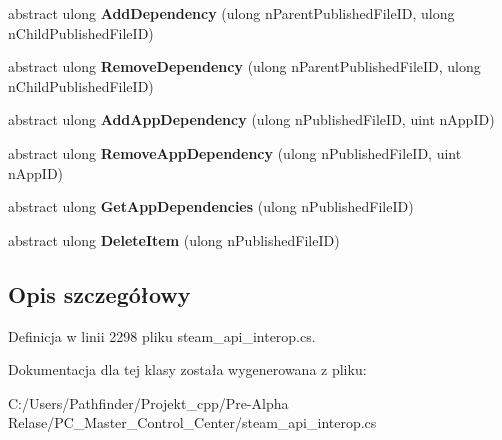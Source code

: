 \begin{DoxyCompactItemize}
abstract ulong {\bfseries Add\+Dependency} (ulong n\+Parent\+Published\+File\+ID, ulong n\+Child\+Published\+File\+ID)
\item 
\mbox{\label{class_valve_1_1_steamworks_1_1_i_steam_u_g_c_aa069183b31a33014ed957a5f93f83eba}} 
abstract ulong {\bfseries Remove\+Dependency} (ulong n\+Parent\+Published\+File\+ID, ulong n\+Child\+Published\+File\+ID)
\item 
\mbox{\label{class_valve_1_1_steamworks_1_1_i_steam_u_g_c_a9b70961d040f10958eb9deeb4f6868d5}} 
abstract ulong {\bfseries Add\+App\+Dependency} (ulong n\+Published\+File\+ID, uint n\+App\+ID)
\item 
\mbox{\label{class_valve_1_1_steamworks_1_1_i_steam_u_g_c_a53f8caa054a5a365a36ce328569dffa6}} 
abstract ulong {\bfseries Remove\+App\+Dependency} (ulong n\+Published\+File\+ID, uint n\+App\+ID)
\item 
\mbox{\label{class_valve_1_1_steamworks_1_1_i_steam_u_g_c_a0f1d3ff6ff88fd8bf5be876a5747b0f2}} 
abstract ulong {\bfseries Get\+App\+Dependencies} (ulong n\+Published\+File\+ID)
\item 
\mbox{\label{class_valve_1_1_steamworks_1_1_i_steam_u_g_c_a71367702bdc98639031da5f907532989}} 
abstract ulong {\bfseries Delete\+Item} (ulong n\+Published\+File\+ID)
\end{DoxyCompactItemize}


\subsection{Opis szczegółowy}


Definicja w linii 2298 pliku steam\+\_\+api\+\_\+interop.\+cs.



Dokumentacja dla tej klasy została wygenerowana z pliku\+:\begin{DoxyCompactItemize}
\item 
C\+:/\+Users/\+Pathfinder/\+Projekt\+\_\+cpp/\+Pre-\/\+Alpha Relase/\+P\+C\+\_\+\+Master\+\_\+\+Control\+\_\+\+Center/steam\+\_\+api\+\_\+interop.\+cs\end{DoxyCompactItemize}
